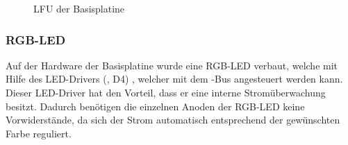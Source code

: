 \begin{figure}[htb]
    \centering
    \qquad
    \qquad
    \caption[LFU der Basisplatine]{LFU der \gls{Basisplatine}}
    \label{fig:basisplatine-lfu}
\end{figure}

\subsubsection{RGB-LED}
Auf der Hardware der \gls{Basisplatine} wurde eine RGB-LED \cite{basis:rgbled} verbaut, welche mit Hilfe des LED-Drivers (, D4) \cite{basis:rgbdriver}, welcher mit dem \IIC{}-Bus angesteuert werden kann. Dieser LED-Driver hat den Vorteil, dass er eine interne Stromüberwachung besitzt. Dadurch benötigen die einzelnen Anoden der RGB-LED keine Vorwiderstände, da sich der Strom automatisch entsprechend der gewünschten Farbe reguliert.


